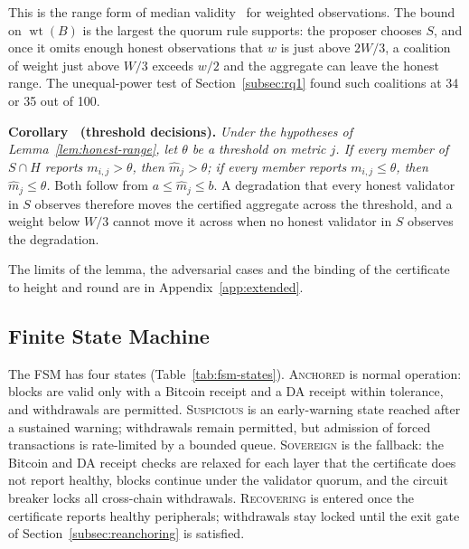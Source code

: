 This is the range form of median validity~\cite{stolz2015median} for weighted
observations. The bound on $\operatorname{wt}(B)$ is the largest the quorum rule
supports: the proposer chooses $S$, and once it omits enough honest
observations that $w$ is just above $2W/3$, a coalition of weight just above
$W/3$ exceeds $w/2$ and the aggregate can leave the honest range. The
unequal-power test of Section~\ref{subsec:rq1} found such coalitions at 34 or 35
out of 100.

\label{cor:threshold}\textbf{Corollary~\thecorollary{} (threshold decisions).}
\emph{Under the hypotheses of Lemma~\ref{lem:honest-range}, let $\theta$ be a
threshold on metric $j$. If every member of $S \cap H$ reports $m_{i,j} > \theta$,
then $\widehat m_j > \theta$; if every member reports $m_{i,j} \le \theta$, then
$\widehat m_j \le \theta$.} Both follow from $a \le \widehat m_j \le b$. A
degradation that every honest validator in $S$ observes therefore moves the
certified aggregate across the threshold, and a weight below $W/3$ cannot move
it across when no honest validator in $S$ observes the degradation.

The limits of the lemma, the adversarial cases and the binding of the certificate to height and round are in Appendix~\ref{app:extended}.

\subsection{Finite State Machine}
\label{subsec:fsm}

The FSM has four states (Table~\ref{tab:fsm-states}). \textsc{Anchored} is
normal operation: blocks are valid only with a Bitcoin receipt and a DA
receipt within tolerance, and withdrawals are permitted.
\textsc{Suspicious} is an early-warning state reached after a sustained
warning; withdrawals remain permitted, but admission of forced transactions
is rate-limited by a bounded queue. \textsc{Sovereign} is the fallback: the
Bitcoin and DA receipt checks are relaxed for each layer that the certificate
does not report healthy, blocks continue under the validator quorum, and the
circuit breaker locks all cross-chain withdrawals. \textsc{Recovering} is
entered once the certificate reports healthy peripherals; withdrawals stay
locked until the exit gate of Section~\ref{subsec:reanchoring} is satisfied.

